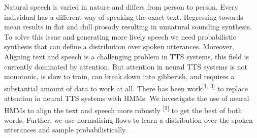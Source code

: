 \large
Natural speech is varied in nature and differs from person to person. Every individual has a different way of speaking the exact text. Regressing towards mean results in flat and dull prosody resulting in unnatural sounding synthesis. To solve this issue and generating more lively speech we need probabilistic synthesis that can define a distribution over spoken utterances. Moreover, Aligning text and speech is a challenging problem in TTS systems, this field is currently dominated by attention. But attention in neural TTS systems is not monotonic, is slow to train, can break down into gibberish, and requires a substantial amount of data to work at all. There has been work\textsuperscript{[1, 3]} to replace attention in neural TTS systems with HMMs. We investigate the use of neural HMMs to align the text and speech more robustly \textsuperscript{[2]}
 to get the best of both words. Further, we use normalising flows to learn a distribution over the spoken utterances and sample probabilistically.
